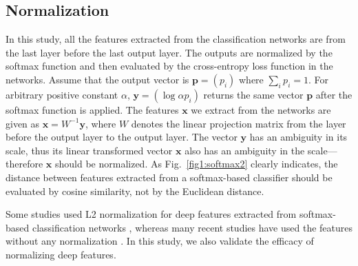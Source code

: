 \documentclass[9pt,technote,compsoc]{./sty/IEEEtran}
\newcommand{\Fref}[1]{Fig.~\ref{#1}}
\begin{document}
\subsection{Normalization}
In this study, all the features extracted from the classification networks are from the last layer before the last output layer.
The outputs are normalized by the softmax function and then evaluated by the cross-entropy loss function in the networks.
Assume that the output vector is $\mathbf{p}=\left(p_i\right)$ where $\sum_{i}p_i=1$.
For arbitrary positive constant $\alpha$, $\mathbf{y}=\left(\log{\alpha p_i}\right)$ returns the same vector $\mathbf{p}$ after the softmax function is applied.
The features $\mathbf{x}$ we extract from the networks are given as $\mathbf{x}=W^{-1}\mathbf{y}$, where $W$ denotes the linear projection matrix from the layer before the output layer to the output layer.
The vector $\mathbf{y}$ has an ambiguity in its scale, thus its linear transformed vector $\mathbf{x}$ also has an ambiguity in the scale---therefore $\mathbf{x}$ should be normalized.
As \Fref{fig1:softmax2} clearly indicates, the distance between features extracted from a softmax-based classifier should be evaluated by cosine similarity, not by the Euclidean distance.

Some studies used L2 normalization for deep features extracted from softmax-based classification networks \cite{taigman2014deepface}\cite{babenko2014neural}, whereas many recent studies have used the features without any normalization \cite{krizhevsky2012imagenet}\cite{song2016deep,wei2016dense}.
In this study, we also validate the efficacy of normalizing deep features.


\end{document}
